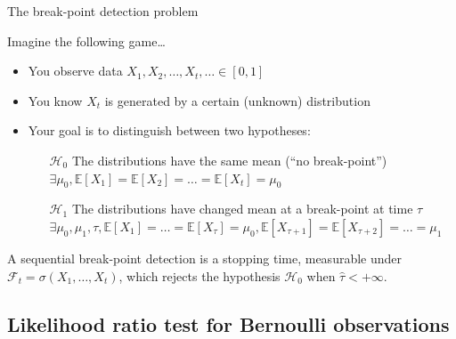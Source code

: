 \documentclass[11pt,english,ignorenonframetext,]{beamer}
\begin{document}
\begin{frame}{The break-point detection problem}

  Imagine the following game\ldots

  \begin{itemize}
    \item You observe data $X_1,X_2,\ldots,X_t,\ldots \in[0,1]$
    \item You know $X_t$ is generated by a certain (unknown) distribution

    \item \alert{Your goal} is to distinguish between two hypotheses:
    \begin{itemize}
      \item[\textcolor{deeppurple}{$\mathcal{H}_0$}] \textcolor{deeppurple}{The distributions have the same mean \hfill{} (``no break-point'')\\
      $\exists \mu_0, \mathbb{E}[X_1] = \mathbb{E}[X_2] = \ldots = \mathbb{E}[X_t] = \mu_0$}

      \item[\textcolor{meca}{$\mathcal{H}_1$}] \textcolor{meca}{The distributions have changed mean at a break-point at time $\tau$ \\
      $\exists \mu_0, \mu_1, \tau, \mathbb{E}[X_1] = \ldots = \mathbb{E}[X_{\tau}] = \mu_0, \mathbb{E}[X_{\tau+1}] = \mathbb{E}[X_{\tau+2}] = \ldots = \mu_1$}
    \end{itemize}
  \end{itemize}

  \pause
  A \alert{sequential break-point detection} is a stopping time,
  measurable under $\mathcal{F}_t = \sigma(X_1,\dots,X_t)$,
  which rejects the hypothesis \textcolor{deeppurple}{$\mathcal{H}_0$}
  when $\widehat{\tau} < +\infty$.

\end{frame}


\subsection{\hfill{}Likelihood ratio test for Bernoulli observations\hfill{}}
\end{document}
